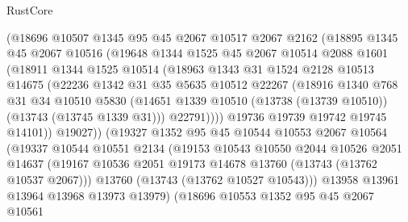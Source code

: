 \begin{lexlean}{RustCore}
\begin{coremodule}
              (@18696
                @10507
                @1345
                @95
                @45
                @2067
                @10517
                @2067
                @2162
                (@18895
                  @1345
                  @45
                  @2067
                  @10516
                  (@19648
                    @1344
                    @1525
                    @45
                    @2067
                    @10514
                    @2088
                    @1601
                    (@18911
                      @1344
                      @1525
                      @10514
                      (@18963
                        @1343
                        @31
                        @1524
                        @2128
                        @10513
                        @14675
                        (@22236
                          @1342
                          @31
                          @35
                          @5635
                          @10512
                          @22267
                          (@18916
                            @1340
                            @768
                            @31
                            @34
                            @10510
                            @5830
                            (@14651
                              @1339
                              @10510
                              (@13738 (@13739 @10510))
                              (@13743 (@13745 @1339 @31)))
                            @22791))))
                    @19736
                    @19739
                    @19742
                    @19745
                    @14101))
                @19027))
            (@19327
              @1352
              @95
              @45
              @10544
              @10553
              @2067
              @10564
              (@19337
                @10544
                @10551
                @2134
                (@19153
                  @10543
                  @10550
                  @2044
                  @10526
                  @2051
                  @14637
                  (@19167 @10536 @2051 @19173 @14678 @13760 (@13743 (@13762 @10537 @2067)))
                  @13760
                  (@13743 (@13762 @10527 @10543)))
                @13958
                @13961
                @13964
                @13968
                @13973
                @13979)
              (@18696
                @10553
                @1352
                @95
                @45
                @2067
                @10561

\end{coremodule}
\end{lexlean}
